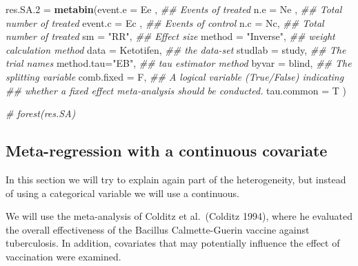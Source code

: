 \documentclass[]{article}
\newenvironment{Shaded}{\begin{snugshade}}{\end{snugshade}}
\newcommand{\CommentTok}[1]{\textcolor[rgb]{0.56,0.35,0.01}{\textit{#1}}}
\newcommand{\DataTypeTok}[1]{\textcolor[rgb]{0.13,0.29,0.53}{#1}}
\newcommand{\FloatTok}[1]{\textcolor[rgb]{0.00,0.00,0.81}{#1}}
\newcommand{\KeywordTok}[1]{\textcolor[rgb]{0.13,0.29,0.53}{\textbf{#1}}}
\newcommand{\NormalTok}[1]{#1}
\newcommand{\StringTok}[1]{\textcolor[rgb]{0.31,0.60,0.02}{#1}}
\begin{document}
\begin{Shaded}
\begin{Highlighting}[]
\NormalTok{res.SA}\FloatTok{.2}\NormalTok{ =}\StringTok{ }\KeywordTok{metabin}\NormalTok{(}\DataTypeTok{event.e =}\NormalTok{ Ee ,      }\CommentTok{## Events of treated}
                 \DataTypeTok{n.e =}\NormalTok{ Ne ,          }\CommentTok{## Total number of treated}
                 \DataTypeTok{event.c =}\NormalTok{ Ec ,      }\CommentTok{## Events of control}
                 \DataTypeTok{n.c =}\NormalTok{ Nc,           }\CommentTok{## Total number of treated}
                 \DataTypeTok{sm =} \StringTok{"RR"}\NormalTok{,          }\CommentTok{## Effect size}
                 \DataTypeTok{method =} \StringTok{"Inverse"}\NormalTok{, }\CommentTok{## weight calculation method}
                 \DataTypeTok{data =}\NormalTok{ Ketotifen,   }\CommentTok{## the data-set}
                 \DataTypeTok{studlab =}\NormalTok{ study,    }\CommentTok{## The trial names}
                 \DataTypeTok{method.tau=}\StringTok{"EB"}\NormalTok{,    }\CommentTok{## tau estimator method}
                 \DataTypeTok{byvar =}\NormalTok{  blind,     }\CommentTok{## The splitting variable  }
                 \DataTypeTok{comb.fixed =}\NormalTok{ F,    }\CommentTok{## A logical variable (True/False) indicating }
                                     \CommentTok{## whether a fixed effect meta-analysis should be conducted.}
                 \DataTypeTok{tau.common =}\NormalTok{ T}
\NormalTok{                 )}

\CommentTok{# forest(res.SA)}
\end{Highlighting}
\end{Shaded}

\hypertarget{meta-regression-with-a-continuous-covariate}{%
\subsection{Meta-regression with a continuous
covariate}\label{meta-regression-with-a-continuous-covariate}}

In this section we will try to explain again part of the heterogeneity,
but instead of using a categorical variable we will use a continuous.

We will use the meta-analysis of Colditz et al.~(Colditz 1994), where he
evaluated the overall effectiveness of the Bacillus Calmette-Guerin
vaccine against tuberculosis. In addition, covariates that may
potentially influence the effect of vaccination were examined.
\end{document}
